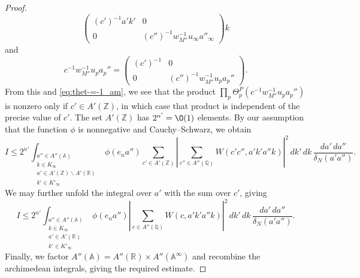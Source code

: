 \begin{proof}
\begin{equation*}
\begin{pmatrix}
      (c')^{-1} a' k' & 0 \\
      0 & (c'')^{-1} w_{M''}^{-1} u_\infty a''_\infty
    \end{pmatrix} k
  \end{equation*}
  and
  \begin{equation*}
    c^{-1} w_{M''}^{-1} u_p a_p''
    =
    \begin{pmatrix}
      (c')^{-1} & 0 \\
      0 & (c'')^{-1} w_{M''}^{-1} u_p a_p''
    \end{pmatrix}.
  \end{equation*}
  From this and \eqref{eq:thet-=-1_am}, we see that the product $\prod_p \Theta_p^P(c^{-1} w_{M''}^{-1} u_p a_p'')$ is nonzero only if $c' \in A'(\mathbb{Z})$, in which case that product is independent of the precise value of $c'$.  The set $A'(\mathbb{Z})$ has $2^{n'} = \O(1)$ elements.  By our assumption that the function $\phi$ is nonnegative and Cauchy--Schwarz, we obtain
  \begin{equation*}
    I \leq
    2^{n'}
    \int_{
      \substack{
        a'' \in A''(\mathbb{A})  \\
        k \in K_\infty  \\
        a' \in A'(\mathbb{Z}) \backslash A'(\mathbb{R}) \\
        k' \in K'_\infty
      }
    }
    \phi(e_n a'')
    \sum_{c' \in A'(\mathbb{Z})}
    \left\lvert
      \sum_{c'' \in A''(\mathbb{Q})}
      W(c' c'', a' k' a'' k)
    \right\rvert^2
    \, d k' \, d k \, \frac{d a' \, d a''}{\delta_N(a' a'')}.
  \end{equation*}
  We may further unfold the integral over $a'$ with the sum over $c'$, giving
  \begin{equation*}
    I
    \leq
    2^{n'}
    \int_{
      \substack{
        a'' \in A''(\mathbb{A})  \\
        k \in K_\infty  \\
        a' \in A'(\mathbb{R}) \\
        k' \in K'_\infty
      }
    }
    \phi(e_n a'')
    \left\lvert
      \sum_{c \in A''(\mathbb{Q})}
      W(c,a' k' a'' k)
    \right\rvert^2
    \, d k' \, d k \, \frac{d a' \, d a''}{\delta_N(a' a'')}.
  \end{equation*}
  Finally, we factor $A''(\mathbb{A}) = A''(\mathbb{R}) \times A''(\mathbb{A}^\infty)$ and recombine the archimedean integrals, giving the required estimate.
\end{proof}

